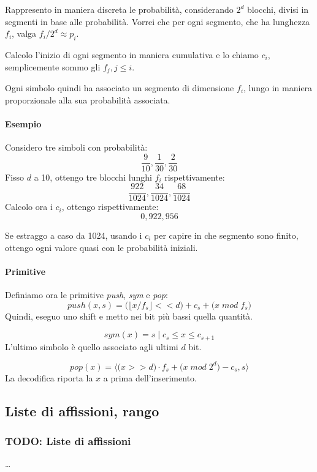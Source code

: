Rappresento in maniera discreta le probabilità, considerando $2^d$ blocchi, divisi in segmenti in base alle probabilità. 
Vorrei che per ogni segmento, che ha lunghezza $f_i$, valga $f_i/2^d \approx p_i$.

Calcolo l'inizio di ogni segmento in maniera cumulativa e lo chiamo $c_i$, semplicemente sommo gli $f_j, j \leq i$.

Ogni simbolo quindi ha associato un segmento di dimensione $f_i$, lungo 
in maniera proporzionale alla sua probabilità associata.

\paragraph{Esempio}
Considero tre simboli con probabilità: $$\frac{9}{10}, \frac{1}{30}, \frac{2}{30}$$
Fisso $d$ a 10, ottengo tre blocchi lunghi $f_i$ rispettivamente: 
$$\frac{922}{1024}, \frac{34}{1024}, \frac{68}{1024}$$
Calcolo ora i $c_i$, ottengo rispettivamente: 
$$0, 922, 956$$
\begin{remark}
    Se estraggo a caso da 1024, usando i $c_i$ per capire in che segmento sono finito, 
    ottengo ogni valore quasi con le probabilità iniziali. 
\end{remark}

\paragraph{Primitive}
Definiamo ora le primitive \emph{push}, \emph{sym} e \emph{pop}:
$$\mathit{push}(x, s) = \big( \big\lfloor x/ f_s \big\rfloor << d \big)
+ c_s + \big( x\;\textit{mod}\;f_s \big)$$
Quindi, eseguo uno shift e metto nei bit più bassi quella quantità.

$$\mathit{sym}(x) = s\; | \; c_s \leq x \leq c_{s+1}$$
L'ultimo simbolo è quello associato agli ultimi $d$ bit. 

$$\mathit{pop}(x) = \langle \big(x >> d\big) \cdot f_s + \big( x\;\textit{mod}\;2^d \big) - c_s, s \rangle$$
La decodifica riporta la $x$ a prima dell'inserimento.

\subsection{Liste di affissioni, rango}
\subsubsection{TODO: Liste di affissioni}
\dots
